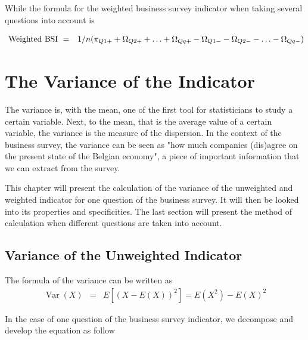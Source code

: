 \documentclass[12pt,a4paper,oneside]{book}
\DeclareMathOperator{\Var}{Var}
\begin{document}
While the formula for the weighted business survey indicator when taking several questions into account is

\begin{eqnarray}
    \mbox{ Weighted BSI}\ &=& 1/n ( \pi_{Q1+} + \Omega_{Q2+} + \ldots + \Omega_{Qq+} - \Omega_{Q1-} - \Omega_{Q2-} - \ldots - \Omega_{Qq-} \Large) \nonumber\\
\end{eqnarray}




\chapter{The Variance of the Indicator}

The variance is, with the mean, one of the first tool for statisticians to study a certain variable. 
Next, to the mean, that is the average value of a certain variable, the variance is the measure of the dispersion. 
In the context of the business survey, the variance can be seen as "how much companies (dis)agree on the present state of the Belgian economy", a piece of important information that we can extract from the survey.


This chapter will present the calculation of the variance of the unweighted and weighted indicator for one question of the business survey. It will then be looked into its properties and specificities.
The last section will present the method of calculation when different questions are taken into account.

\section{Variance of the Unweighted Indicator}

\nocite{alcaniz_calculation_2006}

The formula of the variance can be written as 
\begin{eqnarray}
         \Var(X) &=& E \left[ \left(X-E(X) \right)^2 \right] =  E\left( X^2\right) - E\left( X\right)^2
\end{eqnarray}

In the case of one question of the business survey indicator, we decompose and develop the equation as follow
\end{document}
